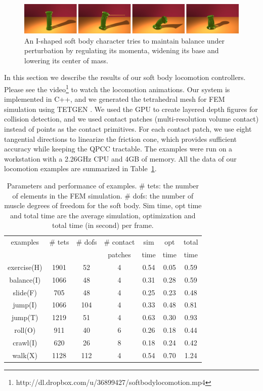 \begin{figure}[ht]
\centering
\includegraphics[width=\textwidth]{figures/IBalance.eps}
\caption{An I-shaped soft body character tries to maintain balance under
perturbation by regulating its momenta, widening its base and lowering its center of mass.}
\label{fig:IBalance}
\end{figure}

In this section we describe the results of our soft body locomotion
controllers. Please see the video\footnote{http://dl.dropbox.com/u/36899427/softbodylocomotion.mp4} to watch the locomotion
animations. Our system is implemented in C++, and we generated the
tetrahedral mesh for FEM simulation using TETGEN \cite{Si:2006}. We
used the GPU to create layered depth figures for collision detection,
and we used contact patches (multi-resolution volume contact)
\cite{Allard:2010} instead of points as the contact primitives. For
each contact patch, we use eight tangential directions to linearize
the friction cone, which provides sufficient accuracy while keeping the QPCC tractable. The examples were run on a workstation with a
2.26GHz CPU and 4GB of memory. All the data of our locomotion
examples are summarized in Table~\ref{table:data}.

\begin{table}[!b]
  \centering
   \caption{Parameters and performance of examples. \# tets: the number of
  elements in the FEM simulation. \# dofs: the number of muscle degrees of
  freedom for the soft body. Sim time, opt time and total time are the average simulation,
  optimization and total time (in second) per frame.}
\begin{tabular}{|c|c|c|c|c|c|c|}
\hline
examples & \# tets & \# dofs  & \# contact     & sim  & opt & total\\
         & & & patches & time & time & time\\
 \hline
exercise(H) & 1901 & 52  & 4 & 0.54 & 0.05 & 0.59\\
balance(I)  & 1066 & 48  & 4 & 0.31 & 0.28 & 0.59\\
slide(F)    & 705  & 48  & 4 & 0.25 & 0.23 & 0.48 \\
jump(I)     & 1066 & 104 & 4 & 0.33 & 0.48 & 0.81 \\
jump(T)     & 1219 & 51  & 4 & 0.63 & 0.30 & 0.93 \\
roll(O)     & 911  & 40  & 6 & 0.26 & 0.18 & 0.44\\
crawl(I)    & 620  & 26  & 8 & 0.18 & 0.24 & 0.42\\
walk(X)     & 1128 & 112 & 4 & 0.54 & 0.70 & 1.24\\
\hline
 \end{tabular}
 \label{table:data}
 \end{table}

